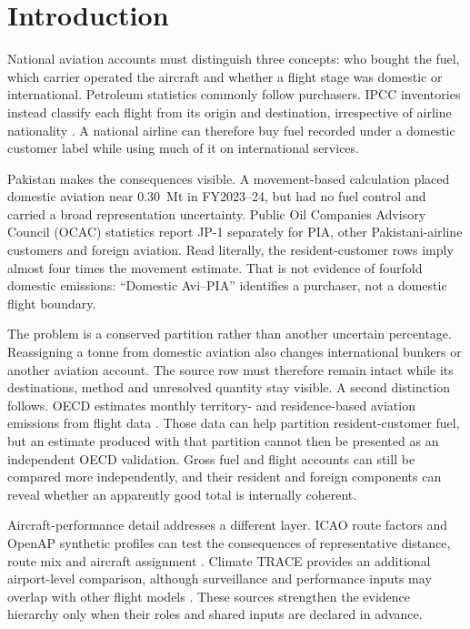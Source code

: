 \section{Introduction}
\label{sec:introduction}

National aviation accounts must distinguish three concepts: who bought the fuel, which carrier
operated the aircraft and whether a flight stage was domestic or international. Petroleum
statistics commonly follow purchasers. IPCC inventories instead classify each flight from its
origin and destination, irrespective of airline nationality \citep{ipcc2006energy}. A national
airline can therefore buy fuel recorded under a domestic customer label while using much of it
on international services.

Pakistan makes the consequences visible. A movement-based calculation placed domestic
aviation near \SI{0.30}{\mega\tonne} \COe{} in FY2023--24, but had no fuel control and carried
a broad representation uncertainty. Public Oil Companies Advisory Council (OCAC) statistics
report JP-1 separately for PIA, other Pakistani-airline customers and foreign aviation. Read
literally, the resident-customer rows imply almost four times the movement estimate. That is
not evidence of fourfold domestic emissions: ``Domestic Avi--PIA'' identifies a purchaser, not
a domestic flight boundary.

The problem is a conserved partition rather than another uncertain percentage. Reassigning a
tonne from domestic aviation also changes international bunkers or another aviation account.
The source row must therefore remain intact while its destinations, method and unresolved
quantity stay visible. A second distinction follows. OECD estimates monthly territory- and
residence-based aviation emissions from flight data \citep{oecdaviation}. Those data can help
partition resident-customer fuel, but an estimate produced with that partition cannot then be
presented as an independent OECD validation. Gross fuel and flight accounts can still be
compared more independently, and their resident and foreign components can reveal whether an
apparently good total is internally coherent.

Aircraft-performance detail addresses a different layer. ICAO route factors and OpenAP
synthetic profiles can test the consequences of representative distance, route mix and
aircraft assignment \citep{icaoicec2024,sun2020openap}. Climate TRACE provides an additional
airport-level comparison, although surveillance and performance inputs may overlap with other
flight models \citep{climatetrace}. These sources strengthen the evidence hierarchy only when
their roles and shared inputs are declared in advance.

